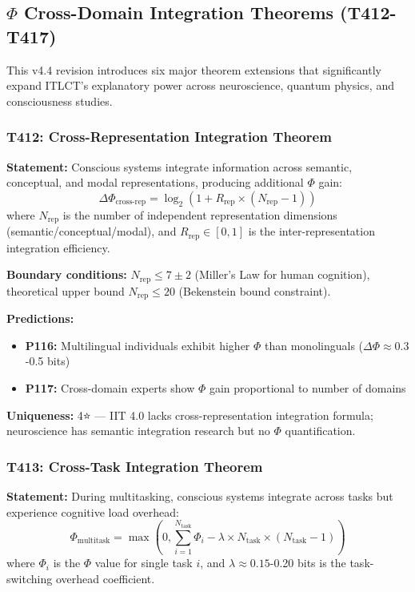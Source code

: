 \documentclass[12pt,a4paper]{article}
\begin{document}
\subsection{$\Phi$ Cross-Domain Integration Theorems (T412-T417)}

This v4.4 revision introduces six major theorem extensions that significantly expand ITLCT's explanatory power across neuroscience, quantum physics, and consciousness studies.

\subsubsection{T412: Cross-Representation Integration Theorem}

\textbf{Statement:} Conscious systems integrate information across semantic, conceptual, and modal representations, producing additional $\Phi$ gain:
\begin{equation}
\Delta\Phi_{\text{cross-rep}} = \log_2(1 + R_{\text{rep}} \times (N_{\text{rep}} - 1))
\end{equation}
where $N_{\text{rep}}$ is the number of independent representation dimensions (semantic/conceptual/modal), and $R_{\text{rep}} \in [0,1]$ is the inter-representation integration efficiency.

\textbf{Boundary conditions:} $N_{\text{rep}} \leq 7 \pm 2$ (Miller's Law for human cognition), theoretical upper bound $N_{\text{rep}} \leq 20$ (Bekenstein bound constraint).

\textbf{Predictions:}
\begin{itemize}
\item \textbf{P116:} Multilingual individuals exhibit higher $\Phi$ than monolinguals ($\Delta\Phi \approx 0.3$-0.5 bits)
\item \textbf{P117:} Cross-domain experts show $\Phi$ gain proportional to number of domains
\end{itemize}

\textbf{Uniqueness:} 4⭐ --- IIT 4.0 lacks cross-representation integration formula; neuroscience has semantic integration research but no $\Phi$ quantification.

\subsubsection{T413: Cross-Task Integration Theorem}

\textbf{Statement:} During multitasking, conscious systems integrate across tasks but experience cognitive load overhead:
\begin{equation}
\Phi_{\text{multitask}} = \max\left(0, \sum_{i=1}^{N_{\text{task}}} \Phi_i - \lambda \times N_{\text{task}} \times (N_{\text{task}} - 1)\right)
\end{equation}
where $\Phi_i$ is the $\Phi$ value for single task $i$, and $\lambda \approx 0.15$-0.20 bits is the task-switching overhead coefficient.
\end{document}
